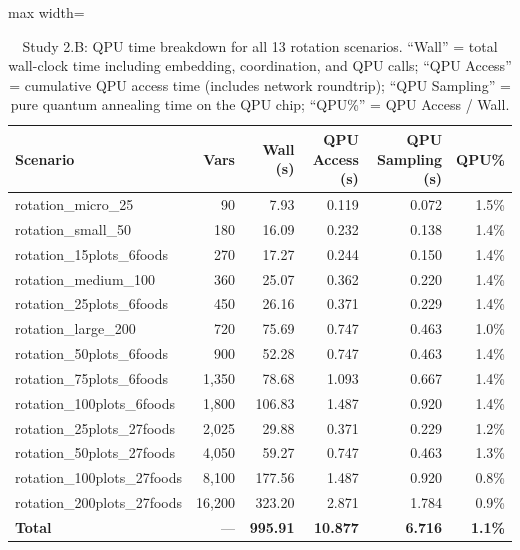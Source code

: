 \documentclass{oqireport}
\begin{document}
\begin{table}[H]
\centering
\caption{Study 2.B: QPU time breakdown for all 13 rotation scenarios. ``Wall'' = total wall-clock time including embedding, coordination, and QPU calls; ``QPU Access'' = cumulative QPU access time (includes network roundtrip); ``QPU Sampling'' = pure quantum annealing time on the QPU chip; ``QPU\%'' = QPU Access / Wall.}
\label{tab:study2b_time_breakdown}
\small
\begin{adjustbox}{max width=\textwidth}
\begin{tabular}{l r r r r r}
\toprule
\textbf{Scenario} & \textbf{Vars} & \textbf{Wall (s)} & \textbf{QPU Access (s)} & \textbf{QPU Sampling (s)} & \textbf{QPU\%} \\
\midrule
rotation\_micro\_25 & 90 & 7.93 & 0.119 & 0.072 & 1.5\% \\
rotation\_small\_50 & 180 & 16.09 & 0.232 & 0.138 & 1.4\% \\
rotation\_15plots\_6foods & 270 & 17.27 & 0.244 & 0.150 & 1.4\% \\
rotation\_medium\_100 & 360 & 25.07 & 0.362 & 0.220 & 1.4\% \\
rotation\_25plots\_6foods & 450 & 26.16 & 0.371 & 0.229 & 1.4\% \\
rotation\_large\_200 & 720 & 75.69 & 0.747 & 0.463 & 1.0\% \\
rotation\_50plots\_6foods & 900 & 52.28 & 0.747 & 0.463 & 1.4\% \\
rotation\_75plots\_6foods & 1,350 & 78.68 & 1.093 & 0.667 & 1.4\% \\
rotation\_100plots\_6foods & 1,800 & 106.83 & 1.487 & 0.920 & 1.4\% \\
rotation\_25plots\_27foods & 2,025 & 29.88 & 0.371 & 0.229 & 1.2\% \\
rotation\_50plots\_27foods & 4,050 & 59.27 & 0.747 & 0.463 & 1.3\% \\
rotation\_100plots\_27foods & 8,100 & 177.56 & 1.487 & 0.920 & 0.8\% \\
rotation\_200plots\_27foods & 16,200 & 323.20 & 2.871 & 1.784 & 0.9\% \\
\midrule
\textbf{Total} & --- & \textbf{995.91} & \textbf{10.877} & \textbf{6.716} & \textbf{1.1\%} \\
\bottomrule
\end{tabular}
\end{adjustbox}
\end{table}


\end{document}

